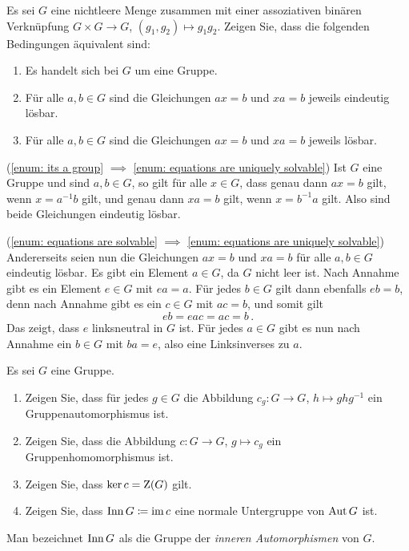 \begin{question}[subtitle = Zur Definition von Gruppen]
  Es sei $G$ eine nichtleere Menge zusammen mit einer assoziativen binären Verknüpfung $G \times G \to G$, $(g_1, g_2) \mapsto g_1 g_2$.
  Zeigen Sie, dass die folgenden Bedingungen äquivalent sind:
  \begin{enumerate}[label=\roman*)]
    \item
      \label{enum: its a group}
      Es handelt sich bei $G$ um eine Gruppe.
    \item
      \label{enum: equations are uniquely solvable}
      Für alle $a, b \in G$ sind die Gleichungen $ax = b$ und $xa = b$ jeweils eindeutig lösbar.
    \item
      \label{enum: equations are solvable}
      Für alle $a, b \in G$ sind die Gleichungen $ax = b$ und $xa = b$ jeweils lösbar.
  \end{enumerate}
\end{question}


\begin{solution}
  (\ref{enum: its a group} $\implies$ \ref{enum: equations are uniquely solvable})
  Ist $G$ eine Gruppe und sind $a, b \in G$, so gilt für alle $x \in G$, dass genau dann $ax = b$ gilt, wenn $x = a^{-1} b$ gilt, und genau dann $xa = b$ gilt, wenn $x = b^{-1} a$ gilt.
  Also sind beide Gleichungen eindeutig lösbar.
  
  (\ref{enum: equations are solvable} $\implies$ \ref{enum: equations are uniquely solvable})
  Andererseits seien nun die Gleichungen $ax = b$ und $xa = b$ für alle $a, b \in G$ eindeutig lösbar.
  Es gibt ein Element $a \in G$, da $G$ nicht leer ist.
  Nach Annahme gibt es ein Element $e \in G$ mit $ea = a$.
  Für jedes $b \in G$ gilt dann ebenfalls $eb = b$, denn nach Annahme gibt es ein $c \in G$ mit $ac = b$, und somit gilt
  \[
      eb
    = eac
    = ac
    = b\,.
  \]
  Das zeigt, dass $e$ linksneutral in $G$ ist.
  Für jedes $a \in G$ gibt es nun nach Annahme ein $b \in G$ mit $ba = e$, also eine Linksinverses zu $a$.
\end{solution}


\begin{question}[subtitle = Innere Automorphismen]
  \label{question: inner automorphims}
  Es sei $G$ eine Gruppe.
  \begin{enumerate}
    \item
      Zeigen Sie, dass für jedes $g \in G$ die Abbildung $c_g \colon G \to G$, $h \mapsto g h g^{-1}$ ein Gruppenautomorphismus ist.
    \item
      Zeigen Sie, dass die Abbildung $c \colon G \to G$, $g \mapsto c_g$ ein Gruppenhomomorphismus ist.
    \item
      Zeigen Sie, dass $\ker c = \operatorname{Z}(G)$ gilt.
    \item
      Zeigen Sie, dass $\operatorname{Inn} G \coloneqq \operatorname{im} c$ eine normale Untergruppe von $\operatorname{Aut} G$ ist.
  \end{enumerate}
  Man bezeichnet $\operatorname{Inn} G$ als die Gruppe der \emph{inneren Automorphismen} von $G$.
\end{question}


